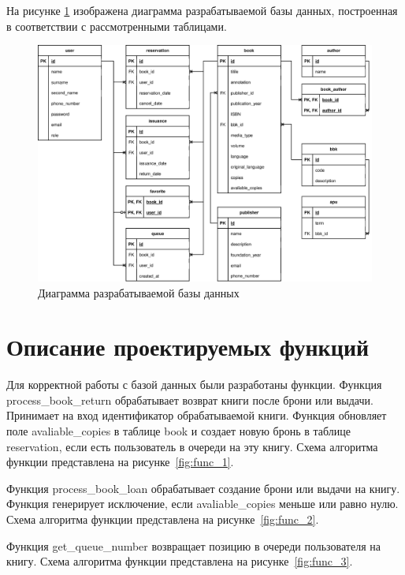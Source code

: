 \clearpage
На рисунке \ref{fig:bd} изображена диаграмма разрабатываемой базы данных, построенная в соответствии с рассмотренными таблицами.
\begin{figure}[H]
	\centering
	\includegraphics[scale=0.7]{img/DB.eps}
	\caption{Диаграмма разрабатываемой базы данных}
	\label{fig:bd}
\end{figure}

\section{Описание проектируемых функций}
Для корректной работы с базой данных были разработаны функции. Функция process\_book\_return обрабатывает возврат книги после брони или выдачи. Принимает на вход идентификатор обрабатываемой книги. Функция обновляет поле avaliable\_copies в таблице book и создает новую бронь в таблице reservation, если есть пользователь в очереди на эту книгу. Схема алгоритма функции представлена на рисунке~\ref{fig:func_1}.

Функция process\_book\_loan обрабатывает создание брони или выдачи на книгу. Функция генерирует исключение, если avaliable\_copies меньше или равно нулю. Схема алгоритма функции представлена на рисунке~\ref{fig:func_2}.

Функция get\_queue\_number возвращает позицию в очереди пользователя на книгу. Схема алгоритма функции представлена на рисунке~\ref{fig:func_3}.

